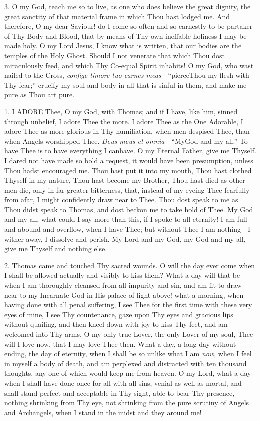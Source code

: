 3. O my God, teach me so to
live, as one who does believe the great dignity, the great sanctity of
that material frame in which Thou hast lodged me. And therefore, O my
dear Saviour! do I come so often and so earnestly to be partaker of Thy
Body and Blood, that by means of Thy own ineffable holiness I may be
made holy. O my Lord Jesus, I know what is written, that our bodies are
the temples of the Holy Ghost. Should I not venerate that which Thou
dost miraculously feed, and which Thy Co-equal Spirit inhabits! O my
God, who wast nailed to the Cross, \emph{confige timore tuo carnes meas}—``pierce\emph{}Thou my flesh with Thy fear;'' crucify my soul and body in all that
is sinful in them, and make me pure as Thou art pure.


1. I ADORE
Thee, O my God, with Thomas; and if I have, like him, sinned through
unbelief, I adore Thee the more. I adore Thee as the One Adorable, I
adore Thee as more glorious in Thy humiliation, when men despised Thee,
than when Angels worshipped Thee. \emph{Deus meus et omnia}—``My\emph{}God
and my all.'' To have Thee is to have everything I can\emph{}have. O my
Eternal Father, give me Thyself. I dared not have made so bold a
request, it would have been presumption, unless Thou hadst encouraged
me. Thou hast put it into my mouth, Thou hast clothed Thyself in my
nature, Thou hast become my Brother, Thou hast died as other men die,
only in far greater bitterness, that, instead of my eyeing Thee
fearfully from afar, I might confidently draw near to Thee. Thou dost
speak to me as Thou didst speak to Thomas, and dost beckon me to take
hold of Thee. My God and my all, what could I say more than this, if I
spoke to all eternity! I am full and abound and overflow, when I have
Thee; but without Thee I am nothing—I wither away, I dissolve and
perish. My Lord and my God, my God and my all, give me Thyself and
nothing else.

2. Thomas came and touched Thy
sacred wounds. O will the day ever come when I shall be allowed actually
and visibly to kiss them? What a day will that be when I am thoroughly
cleansed from all impurity and sin, and am fit to draw near to my
Incarnate God in His palace of light above! what a morning, when having
done with all penal suffering, I see Thee for the first time with these
very eyes of mine, I see Thy countenance, gaze upon Thy eyes and
gracious lips without quailing, and then kneel down with joy to kiss Thy
feet, and am welcomed into Thy arms. O my only true Lover, the only
Lover of my soul, Thee will I love now, that I may love Thee then. What
a day, a long day without ending, the day of eternity, when I shall be
so unlike what I am \emph{now}, when I feel in myself a body of death,
and am perplexed and distracted with ten thousand thoughts, any one of
which would keep me from heaven. O my Lord, what a day when I shall have
done once for all with all sins, venial as well as mortal, and shall
stand perfect and acceptable in Thy sight, able to bear Thy presence,
nothing shrinking from Thy eye, not shrinking from the pure scrutiny of
Angels and Archangels, when I stand in the midst and they around me!

